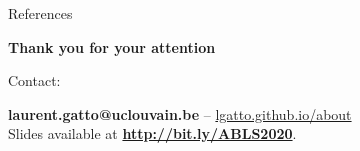 \documentclass{beamer}
\theoremstyle{example}
\begin{document}


\begin{frame}[allowframebreaks]{References}
  \scriptsize
  
  
\end{frame}



\begin{frame}%

\vspace{.1cm}



\begin{center}
  \textbf{Thank you for your attention}
\end{center}


\bigskip

Contact:

\begin{center}
  \textbf{laurent.gatto@uclouvain.be} – \url{lgatto.github.io/about} \\
  Slides available at \textbf{\url{http://bit.ly/ABLS2020}}.
\end{center}

\end{frame}
\end{document}
